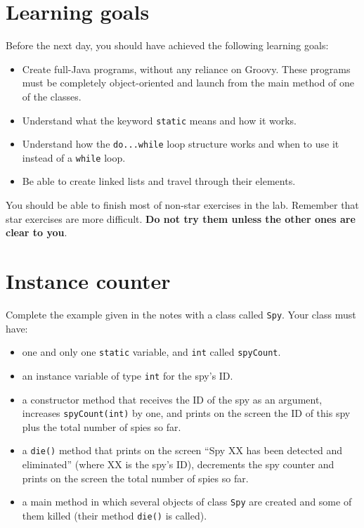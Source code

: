 \documentclass{article}
\begin{document}
\section*{Learning goals}
\label{sec:learning-goals}

Before the next day, you should have achieved the following learning
goals: 

\begin{itemize}
\item Create full-Java programs, without any reliance on Groovy. These
  programs must be completely object-oriented and launch from the main
  method of one of the classes.
\item Understand what the keyword \verb+static+ means and how it
  works. 
\item Understand how the \verb+do...while+ loop structure works and
  when to use it instead of a \verb+while+ loop.
\item Be able to create linked lists and travel through their
  elements. 
\end{itemize}

You should be able to finish most of non-star exercises in the lab. 
Remember that star exercises are more difficult. 
\textbf{Do not try them unless the other ones are clear to you}. 

\section{Instance counter}
\label{sec:instance-counter}

Complete the example given in the notes with a class called
\verb+Spy+. Your class must have: 

\begin{itemize}
\item one and only one \verb+static+ variable, and \verb+int+ called
  \verb+spyCount+.
\item an instance variable of type \verb+int+ for the spy's ID.
\item a constructor method that receives
  the ID of the spy as an argument, increases
  \verb+spyCount(int)+ by one, 
  and prints on the screen the ID of this spy plus the total number of
  spies so far.
\item a \verb+die()+ method that prints on the screen ``Spy XX has
  been detected and eliminated'' (where XX is the spy's ID), 
  decrements the spy counter and prints
  on the screen the total number of spies so far. 
\item a main method in which several objects of class \verb+Spy+ are
  created and some of them killed (their method \verb+die()+ is
  called). 
\end{itemize}
\end{document}
